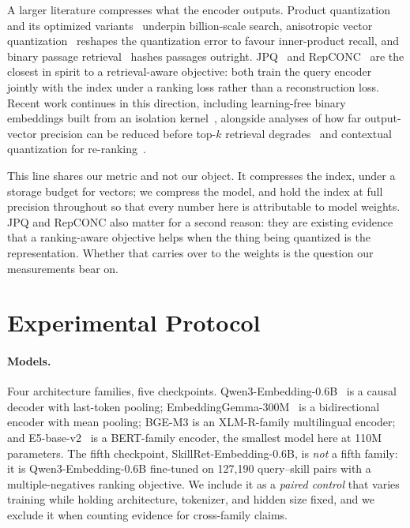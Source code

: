 \documentclass[11pt]{article}
\begin{document}
A larger literature compresses what the encoder outputs. Product quantization~\cite{pq} and its
optimized variants~\cite{opq} underpin billion-scale search, anisotropic vector
quantization~\cite{avq} reshapes the quantization error to favour inner-product recall, and
binary passage retrieval~\cite{bpr} hashes passages outright. JPQ~\cite{jpq} and
RepCONC~\cite{repconc} are the closest in spirit to a retrieval-aware objective: both train
the query encoder jointly with the index under a ranking loss rather than a reconstruction
loss. Recent work continues in this direction, including learning-free binary embeddings
built from an isolation kernel~\cite{ike}, alongside analyses of how far output-vector
precision can be reduced before top-$k$ retrieval degrades~\cite{point1,topktheory} and
contextual quantization for re-ranking~\cite{ctxquant}.

This line shares our metric and not our object. It compresses the index, under a storage
budget for vectors; we compress the model, and hold the index at full precision throughout so
that every number here is attributable to model weights. JPQ and RepCONC also matter for a
second reason: they are existing evidence that a ranking-aware objective helps when the thing
being quantized is the representation. Whether that carries over to the weights is the
question our measurements bear on.

\section{Experimental Protocol}
\label{sec:protocol}

\paragraph{Models.} Four architecture families, five checkpoints.
Qwen3-Embedding-0.6B~\cite{qwen3emb} is a causal decoder with last-token pooling;
EmbeddingGemma-300M~\cite{embgemma} is a bidirectional encoder with mean pooling; BGE-M3
\cite{bgem3} is an XLM-R-family multilingual encoder; and E5-base-v2~\cite{e5} is a
BERT-family encoder, the smallest model here at 110M parameters. The fifth checkpoint,
SkillRet-Embedding-0.6B, is \emph{not} a fifth family: it is Qwen3-Embedding-0.6B fine-tuned
on 127{,}190 query--skill pairs with a multiple-negatives ranking objective. We include it as
a \emph{paired control} that varies training while holding architecture, tokenizer, and
hidden size fixed, and we exclude it when counting evidence for cross-family claims.
\end{document}
